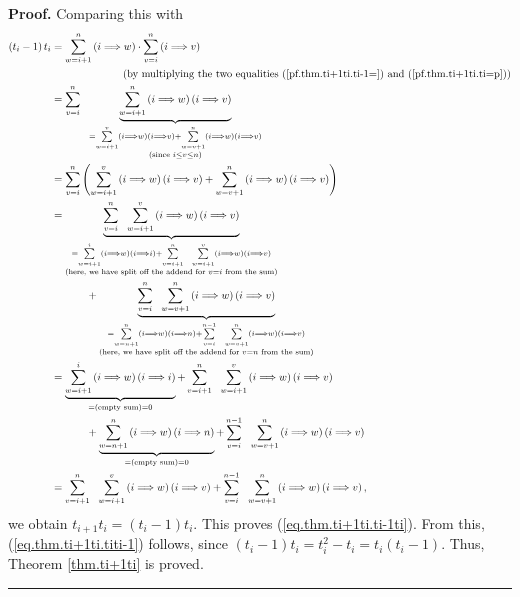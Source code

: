 \documentclass[numbers=enddot,12pt,final,onecolumn,notitlepage]{scrartcl}%
\theoremstyle{definition}
\newenvironment{proof}[1][Proof]{\noindent\textbf{#1.} }{\ \rule{0.5em}{0.5em}}
\let\sumnonlimits\sum
\renewcommand{\sum}{\sumnonlimits\limits}
\begin{document}
\begin{proof}
Comparing this with%
\begin{align*}
\left(  t_{i}-1\right)  t_{i}  &  =\sum_{w=i+1}^{n}\left(  i\Longrightarrow
w\right)  \cdot\sum_{v=i}^{n}\left(  i\Longrightarrow v\right) \\
&  \ \ \ \ \ \ \ \ \ \ \ \ \ \ \ \ \ \ \ \ \left(  \text{by multiplying the
two equalities (\ref{pf.thm.ti+1ti.ti-1=}) and (\ref{pf.thm.ti+1ti.ti=p}%
)}\right) \\
&  =\sum_{v=i}^{n}\ \ \underbrace{\sum_{w=i+1}^{n}\left(  i\Longrightarrow
w\right)  \left(  i\Longrightarrow v\right)  }_{\substack{=\sum_{w=i+1}%
^{v}\left(  i\Longrightarrow w\right)  \left(  i\Longrightarrow v\right)
+\sum_{w=v+1}^{n}\left(  i\Longrightarrow w\right)  \left(  i\Longrightarrow
v\right)  \\\text{(since }i\leq v\leq n\text{)}}}\\
&  =\sum_{v=i}^{n}\left(  \sum_{w=i+1}^{v}\left(  i\Longrightarrow w\right)
\left(  i\Longrightarrow v\right)  +\sum_{w=v+1}^{n}\left(  i\Longrightarrow
w\right)  \left(  i\Longrightarrow v\right)  \right) \\
&  =\underbrace{\sum_{v=i}^{n}\ \ \sum_{w=i+1}^{v}\left(  i\Longrightarrow
w\right)  \left(  i\Longrightarrow v\right)  }_{\substack{=\sum_{w=i+1}%
^{i}\left(  i\Longrightarrow w\right)  \left(  i\Longrightarrow i\right)
+\sum_{v=i+1}^{n}\ \ \sum_{w=i+1}^{v}\left(  i\Longrightarrow w\right)
\left(  i\Longrightarrow v\right)  \\\text{(here, we have split off the addend
for }v=i\text{ from the sum)}}}\\
&  \ \ \ \ \ \ \ \ \ \ +\underbrace{\sum_{v=i}^{n}\ \ \sum_{w=v+1}^{n}\left(
i\Longrightarrow w\right)  \left(  i\Longrightarrow v\right)  }%
_{\substack{=\sum_{w=n+1}^{n}\left(  i\Longrightarrow w\right)  \left(
i\Longrightarrow n\right)  +\sum_{v=i}^{n-1}\ \ \sum_{w=v+1}^{n}\left(
i\Longrightarrow w\right)  \left(  i\Longrightarrow v\right)  \\\text{(here,
we have split off the addend for }v=n\text{ from the sum)}}}\\
&  =\underbrace{\sum_{w=i+1}^{i}\left(  i\Longrightarrow w\right)  \left(
i\Longrightarrow i\right)  }_{=\left(  \text{empty sum}\right)  =0}%
+\sum_{v=i+1}^{n}\ \ \sum_{w=i+1}^{v}\left(  i\Longrightarrow w\right)
\left(  i\Longrightarrow v\right) \\
&  \ \ \ \ \ \ \ \ \ \ +\underbrace{\sum_{w=n+1}^{n}\left(  i\Longrightarrow
w\right)  \left(  i\Longrightarrow n\right)  }_{=\left(  \text{empty
sum}\right)  =0}+\sum_{v=i}^{n-1}\ \ \sum_{w=v+1}^{n}\left(  i\Longrightarrow
w\right)  \left(  i\Longrightarrow v\right) \\
&  =\sum_{v=i+1}^{n}\ \ \sum_{w=i+1}^{v}\left(  i\Longrightarrow w\right)
\left(  i\Longrightarrow v\right)  +\sum_{v=i}^{n-1}\ \ \sum_{w=v+1}%
^{n}\left(  i\Longrightarrow w\right)  \left(  i\Longrightarrow v\right)  ,
\end{align*}
we obtain $t_{i+1}t_{i}=\left(  t_{i}-1\right)  t_{i}$. This proves
(\ref{eq.thm.ti+1ti.ti-1ti}). From this, (\ref{eq.thm.ti+1ti.titi-1}) follows,
since $\left(  t_{i}-1\right)  t_{i}=t_{i}^{2}-t_{i}=t_{i}\left(
t_{i}-1\right)  $. Thus, Theorem \ref{thm.ti+1ti} is proved.
\end{proof}
\end{document}
